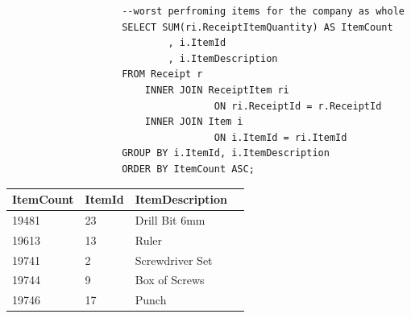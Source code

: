 \documentclass{article}
\begin{document}
                \begin{lstlisting}
                    --worst perfroming items for the company as whole
                    SELECT SUM(ri.ReceiptItemQuantity) AS ItemCount
                            , i.ItemId
                            , i.ItemDescription
                    FROM Receipt r
                        INNER JOIN ReceiptItem ri
                                    ON ri.ReceiptId = r.ReceiptId
                        INNER JOIN Item i
                                    ON i.ItemId = ri.ItemId
                    GROUP BY i.ItemId, i.ItemDescription
                    ORDER BY ItemCount ASC;
                \end{lstlisting}

                \begin{table}[H]
                    \centering
                    \begin{tabular}{|l|l|l|l|}
                    \hline
                    ItemCount & ItemId & ItemDescription \\ \hline
                    19481     & 23     & Drill Bit 6mm   \\ \hline
                    19613     & 13     & Ruler           \\ \hline
                    19741     & 2      & Screwdriver Set \\ \hline
                    19744     & 9      & Box of Screws   \\ \hline
                    19746     & 17     & Punch           \\ \hline
                    \end{tabular}
                    \end{table}

\newpage
\end{document}
